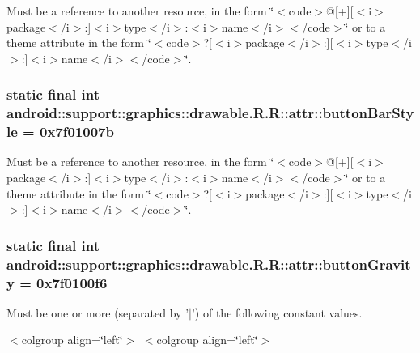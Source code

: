 Must be a reference to another resource, in the form \char`\"{}$<$code$>$@\mbox{[}+\mbox{]}\mbox{[}$<$i$>$package$<$/i$>$:\mbox{]}$<$i$>$type$<$/i$>$:$<$i$>$name$<$/i$>$$<$/code$>$\char`\"{} or to a theme attribute in the form \char`\"{}$<$code$>$?\mbox{[}$<$i$>$package$<$/i$>$:\mbox{]}\mbox{[}$<$i$>$type$<$/i$>$:\mbox{]}$<$i$>$name$<$/i$>$$<$/code$>$\char`\"{}. \hypertarget{classandroid_1_1support_1_1graphics_1_1drawable_1_1_r_1_1attr_351f2a8e2bcb5f52aeb9ca82e4201490}{
\subsubsection[{buttonBarStyle}]{\setlength{\rightskip}{0pt plus 5cm}static final int android::support::graphics::drawable.R.R::attr::buttonBarStyle = 0x7f01007b}}
\label{classandroid_1_1support_1_1graphics_1_1drawable_1_1_r_1_1attr_351f2a8e2bcb5f52aeb9ca82e4201490}


Must be a reference to another resource, in the form \char`\"{}$<$code$>$@\mbox{[}+\mbox{]}\mbox{[}$<$i$>$package$<$/i$>$:\mbox{]}$<$i$>$type$<$/i$>$:$<$i$>$name$<$/i$>$$<$/code$>$\char`\"{} or to a theme attribute in the form \char`\"{}$<$code$>$?\mbox{[}$<$i$>$package$<$/i$>$:\mbox{]}\mbox{[}$<$i$>$type$<$/i$>$:\mbox{]}$<$i$>$name$<$/i$>$$<$/code$>$\char`\"{}. \hypertarget{classandroid_1_1support_1_1graphics_1_1drawable_1_1_r_1_1attr_a7207aa3459f14eabcee14ae07694677}{
\subsubsection[{buttonGravity}]{\setlength{\rightskip}{0pt plus 5cm}static final int android::support::graphics::drawable.R.R::attr::buttonGravity = 0x7f0100f6}}
\label{classandroid_1_1support_1_1graphics_1_1drawable_1_1_r_1_1attr_a7207aa3459f14eabcee14ae07694677}


Must be one or more (separated by '$|$') of the following constant values. \begin{TabularC}{0}
\hline
\end{TabularC}
$<$colgroup align=\char`\"{}left\char`\"{}$>$ $<$colgroup align=\char`\"{}left\char`\"{}$>$ 

